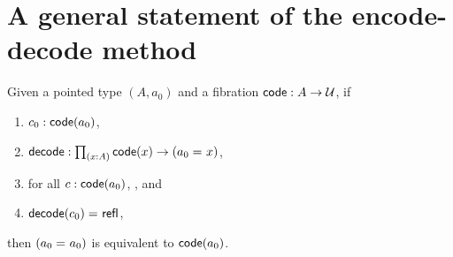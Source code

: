 \documentclass[hott-all.tex]{subfiles}
\begin{document}
\section{A general statement of the encode-decode method}
% 
% 
% 
% 
\begin{lem}
Given a pointed type $(A,a_0)$ and a fibration
$\mathsf{code} : A \to \mathcal{U}$, if
\begin{enumerate}
\item $c_0 : \mathsf{code}(a_0)$,
\item $\decode : \prd{x:A} \code(x) \to (\id{a_0}{x})$,
\item for all $c : \mathsf{code}(a_0)$, , and
\item $\mathsf{decode}(c_0) =_{} \mathsf{refl}_{}$,
\end{enumerate}
then $(a_0 =_{} a_0)$ is equivalent to $\mathsf{code}(a_0)$.
\end{lem}
\end{document}
